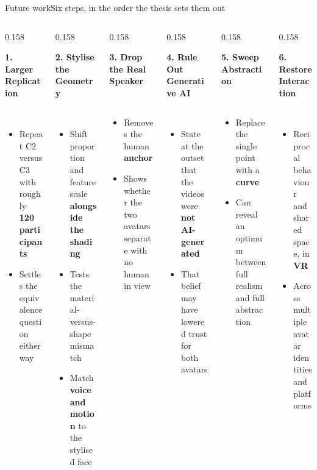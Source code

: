 \documentclass[aspectratio=169,10pt]{beamer}
\newcommand{\hl}[1]{{\color{knblue}\textbf{#1}}}
\newcommand{\panelheadsm}[1]{\noindent\colorbox{kncyan}{\parbox{0.96\textwidth}{\centering\vspace{1pt}\color{white}\tiny\bfseries #1\vspace{1pt}}}\\[0.2em]}
\newcommand{\panel}[1]{\noindent\colorbox{knlight}{\parbox{0.96\textwidth}{\vspace{2pt}\scriptsize
\begin{itemize}\setlength{\itemsep}{0.2em}\setlength{\leftmargini}{1.1em}#1\end{itemize}\vspace{2pt}}}}
\begin{document}
\begin{frame}{Future work}{Six steps, in the order the thesis sets them out}
  \vspace{0.6em}
  \begin{columns}[T,onlytextwidth]
    \begin{column}{0.158\textwidth}
      \panelheadsm{1. Larger Replication}
      \panel{%
        \item Repeat C2 versus C3 with roughly \hl{120 participants}
        \item Settles the equivalence question either way}
    \end{column}
    \begin{column}{0.158\textwidth}
      \panelheadsm{2. Stylise the Geometry}
      \panel{%
        \item Shift proportion and feature scale \hl{alongside the shading}
        \item Tests the material-versus-shape mismatch
        \item Match \hl{voice and motion} to the stylised face}
    \end{column}
    \begin{column}{0.158\textwidth}
      \panelheadsm{3. Drop the Real Speaker}
      \panel{%
        \item Removes the human \hl{anchor}
        \item Shows whether the two avatars separate with no human in view}
    \end{column}
    \begin{column}{0.158\textwidth}
      \panelheadsm{4. Rule Out Generative AI}
      \panel{%
        \item State at the outset that the videos were \hl{not AI-generated}
        \item That belief may have lowered trust for both avatars}
    \end{column}
    \begin{column}{0.158\textwidth}
      \panelheadsm{5. Sweep Abstraction}
      \panel{%
        \item Replace the single point with a \hl{curve}
        \item Can reveal an optimum between full realism and full abstraction}
    \end{column}
    \begin{column}{0.158\textwidth}
      \panelheadsm{6. Restore Interaction}
      \panel{%
        \item Reciprocal behaviour and shared space, in \hl{VR}
        \item Across multiple avatar identities and platforms}
    \end{column}
  \end{columns}
\end{frame}
\end{document}
